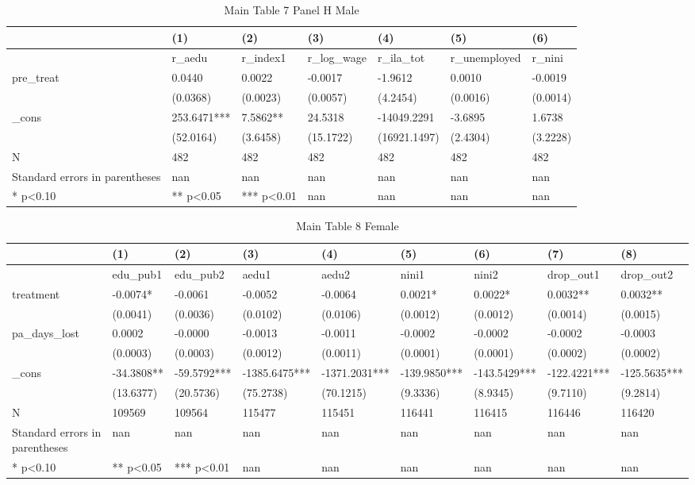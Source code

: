 \documentclass[11pt]{article}
\begin{document}
\clearpage
\begin{table}[!htbp]
\centering
\caption{Main Table 7 Panel H Male}
\label{tab:table7h_m}
\begin{tabular}{lllllll}
\toprule
 & (1) & (2) & (3) & (4) & (5) & (6) \\
\midrule
 & r\_aedu & r\_index1 & r\_log\_wage & r\_ila\_tot & r\_unemployed & r\_nini \\
pre\_treat & 0.0440 & 0.0022 & -0.0017 & -1.9612 & 0.0010 & -0.0019 \\
 & (0.0368) & (0.0023) & (0.0057) & (4.2454) & (0.0016) & (0.0014) \\
\_cons & 253.6471*** & 7.5862** & 24.5318 & -14049.2291 & -3.6895 & 1.6738 \\
 & (52.0164) & (3.6458) & (15.1722) & (16921.1497) & (2.4304) & (3.2228) \\
N & 482 & 482 & 482 & 482 & 482 & 482 \\
Standard errors in parentheses & nan & nan & nan & nan & nan & nan \\
* p<0.10 & ** p<0.05 & *** p<0.01 & nan & nan & nan & nan \\
\bottomrule
\end{tabular}

\end{table}

\clearpage
\begin{table}[!htbp]
\centering
\caption{Main Table 8 Female}
\label{tab:table8_f}
\begin{tabular}{lllllllll}
\toprule
 & (1) & (2) & (3) & (4) & (5) & (6) & (7) & (8) \\
\midrule
 & edu\_pub1 & edu\_pub2 & aedu1 & aedu2 & nini1 & nini2 & drop\_out1 & drop\_out2 \\
treatment & -0.0074* & -0.0061 & -0.0052 & -0.0064 & 0.0021* & 0.0022* & 0.0032** & 0.0032** \\
 & (0.0041) & (0.0036) & (0.0102) & (0.0106) & (0.0012) & (0.0012) & (0.0014) & (0.0015) \\
pa\_days\_lost & 0.0002 & -0.0000 & -0.0013 & -0.0011 & -0.0002 & -0.0002 & -0.0002 & -0.0003 \\
 & (0.0003) & (0.0003) & (0.0012) & (0.0011) & (0.0001) & (0.0001) & (0.0002) & (0.0002) \\
\_cons & -34.3808** & -59.5792*** & -1385.6475*** & -1371.2031*** & -139.9850*** & -143.5429*** & -122.4221*** & -125.5635*** \\
 & (13.6377) & (20.5736) & (75.2738) & (70.1215) & (9.3336) & (8.9345) & (9.7110) & (9.2814) \\
N & 109569 & 109564 & 115477 & 115451 & 116441 & 116415 & 116446 & 116420 \\
Standard errors in parentheses & nan & nan & nan & nan & nan & nan & nan & nan \\
* p<0.10 & ** p<0.05 & *** p<0.01 & nan & nan & nan & nan & nan & nan \\
\bottomrule
\end{tabular}

\end{table}
\end{document}
